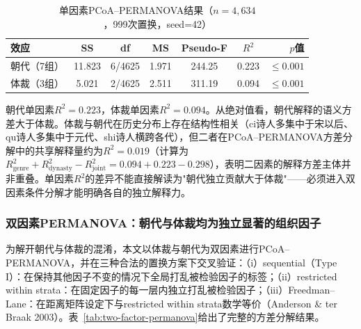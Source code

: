 \documentclass[12pt,a4paper]{article}
\numberwithin{equation}{section}
\begin{document}
\begin{table}[htbp]
  \centering
  \caption{单因素PCoA--PERMANOVA结果（$n=4,634$，999次置换，seed=42）}
  \label{tab:single-permanova}
  \begin{tabular}{lcccccr}
    \toprule
    效应         & SS       & df          & MS       & Pseudo-F & $R^{2}$  & $p$值   \\
    \midrule
    朝代（7组）  & 11.823   & 6/4625      & 1.971    & 244.25   & 0.223    & $\leq0.001$ \\
    体裁（3组）  & 5.021    & 2/4625      & 2.511    & 311.19   & 0.094    & $\leq0.001$ \\
    \bottomrule
  \end{tabular}
\end{table}

朝代单因素$R^{2}=0.223$，体裁单因素$R^{2}=0.094$。从绝对值看，朝代解释的语义方差大于体裁。体裁与朝代在历史分布上存在结构性相关（ci诗人多集中于宋以后、qu诗人多集中于元代、shi诗人横跨各代），但二者在PCoA--PERMANOVA方差分解中的共享解释量约为$R^{2}=0.019$（计算为$R^{2}_{\text{genre}}+R^{2}_{\text{dynasty}}-R^{2}_{\text{joint}}=0.094+0.223-0.298$），表明二因素的解释方差主体并非重叠。单因素$R^{2}$的差异不能直接解读为"朝代独立贡献大于体裁"——必须进入双因素条件分解才能明确各自的独立解释力。

\subsubsection{双因素PERMANOVA：朝代与体裁均为独立显著的组织因子}\label{sec:permanova-results}

为解开朝代与体裁的混淆，本文以体裁与朝代为双因素进行PCoA--PERMANOVA，并在三种合法的置换方案下交叉验证：（i）sequential（Type I）：在保持其他因子不变的情况下全局打乱被检验因子的标签；（ii）restricted within strata：在固定因子的每一层内独立打乱被检验因子；（iii）Freedman--Lane：在距离矩阵设定下与restricted within strata数学等价（Anderson \& ter Braak 2003）。表~\ref{tab:two-factor-permanova}给出了完整的方差分解结果。
\end{document}
